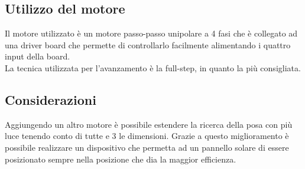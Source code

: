\documentclass[12pt,oneside,a4paper]{article}
\begin{document}
\subsection{Utilizzo del motore}\cite{Video}
Il motore utilizzato è un motore passo-passo unipolare a 4 fasi che è collegato ad una driver board che permette di controllarlo facilmente alimentando i quattro input della board.
\\La tecnica utilizzata per l'avanzamento è la full-step, in quanto la più consigliata.


\subsection{Considerazioni}
Aggiungendo un altro motore è possibile estendere la ricerca della posa con più luce tenendo conto di tutte e 3 le dimensioni.
Grazie a questo miglioramento è possibile realizzare un dispositivo che permetta ad un pannello solare di essere posizionato sempre nella posizione che dia la maggior efficienza.




\end{document}
